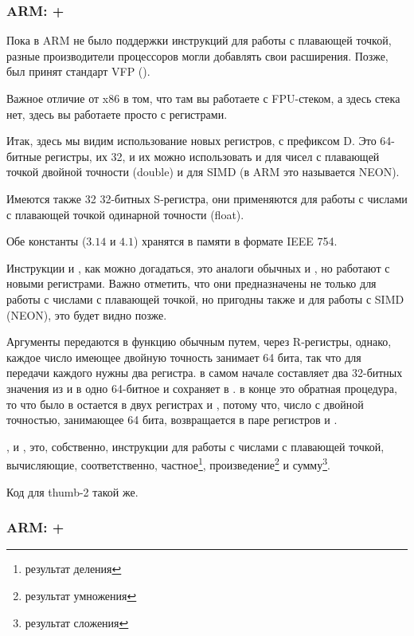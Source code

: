 ﻿\subsubsection{ARM: \OptimizingXcode + \ARMMode}

Пока в ARM не было поддержки инструкций для работы с плавающей точкой, разные производители процессоров
могли добавлять свои расширения. Позже, был принят стандарт VFP ().

Важное отличие от x86 в том, что там вы работаете с FPU-стеком, а здесь стека нет, 
здесь вы работаете просто с регистрами.



Итак, здесь мы видим использование новых регистров, с префиксом D. 
Это 64-битные регистры, их 32, и их можно
использовать и для чисел с плавающей точкой двойной точности (double) и для SIMD (в ARM это называется NEON).

Имеются также 32 32-битных S-регистра, они применяются для работы с числами с плавающей точкой одинарной точности
(float).

Обе константы ($3.14$ и $4.1$) хранятся в памяти в формате IEEE 754.

Инструкции  и , как можно догадаться, это аналоги обычных  и \MOV, 
но работают с новыми регистрами.
Важно отметить, что они предназначены не только для работы с числами с плавающей точкой, но пригодны также и для
работы с SIMD (NEON), это будет видно позже.

Аргументы передаются в функцию обычным путем, через R-регистры, однако, каждое число имеющее двойную точность
занимает 64 бита, так что для передачи каждого нужны два регистра. 
 в самом начале
составляет два 32-битных значения из  и  в одно 64-битное и сохраняет в . 
 в конце это обратная процедура, то что было в  
остается в двух регистрах  и ,
потому что, число с двойной точностью, занимающее 64 бита, возвращается в паре регистров  и .

,  и , это, собственно, инструкции для работы с числами с плавающей точкой, 
вычисляющие, соответственно, частное\footnote{результат деления}, 
произведение\footnote{результат умножения} и сумму\footnote{результат сложения}.

Код для thumb-2 такой же.

\subsubsection{ARM: \OptimizingKeil + \ThumbMode}

